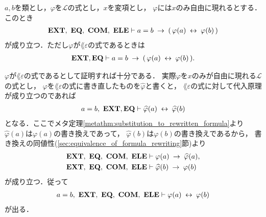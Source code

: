	
	
	\begin{screen}
		\begin{thm}[代入原理]\label{thm:the_principle_of_substitution}
			$a,b$を類とし，$\varphi$を$\mathcal{L}$の式とし，$x$を変項とし，
			$\varphi$には$x$のみ自由に現れるとする．このとき
			\begin{align}
				\mbox{{\bf EXT}},\ \mbox{{\bf EQ}},\ \mbox{\bf COM},\ \mbox{{\bf ELE}} \vdash a = b \hspace{0.25em}\rightarrow\hspace{0.25em} 
				(\, \varphi(a) \hspace{0.25em}\leftrightarrow\hspace{0.25em} \varphi(b)\, )
			\end{align}
			が成り立つ．ただし$\varphi$が$\lang{\varepsilon}$の式であるときは
			\begin{align}
				\mbox{{\bf EXT}},\mbox{{\bf EQ}} \vdash a = b \hspace{0.25em}\rightarrow\hspace{0.25em} 
				(\, \varphi(a) \hspace{0.25em}\leftrightarrow\hspace{0.25em} \varphi(b)\, ).
			\end{align}
		\end{thm}
	\end{screen}
	
	$\varphi$が$\lang{\varepsilon}$の式であるとして証明すれば十分である．
	実際$\varphi$を$x$のみが自由に現れる$\mathcal{L}$の式とし，
	$\varphi$を$\lang{\varepsilon}$の式に書き直したものを$\widehat{\varphi}$と書くと，
	$\lang{\varepsilon}$の式に対して代入原理が成り立つのであれば
	\begin{align}
		a = b,\ \mbox{{\bf EXT}},\mbox{{\bf EQ}} \vdash \widehat{\varphi}(a) \hspace{0.25em}\leftrightarrow\hspace{0.25em} \widehat{\varphi}(b)
	\end{align}
	となる．ここでメタ定理\ref{metathm:substitution_to_rewritten_formula}より
	$\widehat{\varphi}(a)$は$\varphi(a)$の書き換えであって，
	$\widehat{\varphi}(b)$は$\varphi(b)$の書き換えであるから，
	書き換えの同値性(\ref{sec:equivalence_of_formula_rewriting}節)より
	\begin{align}
		\mbox{{\bf EXT}},\ \mbox{{\bf EQ}},\ \mbox{\bf COM},\ \mbox{{\bf ELE}} &\vdash \varphi(a) \hspace{0.25em}\rightarrow\hspace{0.25em} \widehat{\varphi}(a), \\
		\mbox{{\bf EXT}},\ \mbox{{\bf EQ}},\ \mbox{\bf COM},\ \mbox{{\bf ELE}} &\vdash \widehat{\varphi}(b) \hspace{0.25em}\rightarrow\hspace{0.25em} \varphi(b)
	\end{align}
	が成り立つ．従って
	\begin{align}
		a = b,\ \mbox{{\bf EXT}},\ \mbox{{\bf EQ}},\ \mbox{\bf COM},\ \mbox{{\bf ELE}} \vdash \varphi(a) \hspace{0.25em}\leftrightarrow\hspace{0.25em} \varphi(b)
	\end{align}
	が出る．
	
